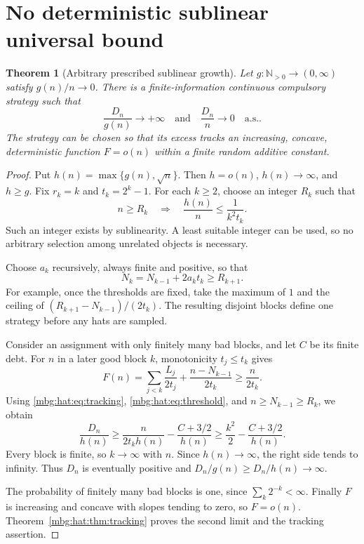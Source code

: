 \documentclass[11pt,letterpaper]{article}
\newtheorem{theorem}{Theorem}[section]
\theoremstyle{definition}
\newcommand{\N}{\mathbb N}
\newcommand{\as}{\text{a.s.}}
\begin{document}
\section{No deterministic sublinear universal bound}
\label{mbg:hat:sec:main}

\begin{theorem}[Arbitrary prescribed sublinear growth]\label{mbg:hat:thm:main}
Let \(g:\N_{>0}\to(0,\infty)\) satisfy \(g(n)/n\to0\).
There is a finite-information continuous compulsory strategy such that
\[
  \frac{D_n}{g(n)}\longrightarrow+\infty
  \quad\text{and}\quad
  \frac{D_n}{n}\longrightarrow0
  \quad\as.                                               \tag{24.1}\label{mbg:hat:eq:main}
\]
The strategy can be chosen so that its excess tracks an increasing,
concave, deterministic function \(F=o(n)\) within a finite random
additive constant.
\end{theorem}
\begin{proof}
Put \(h(n)=\max\{g(n),\sqrt n\}\). Then \(h=o(n)\),
\(h(n)\to\infty\), and \(h\ge g\).
Fix \(r_k=k\) and \(t_k=2^k-1\).
For each \(k\ge2\), choose an integer \(R_k\) such that
\[
  n\ge R_k
  \quad\Longrightarrow\quad
  \frac{h(n)}{n}\le\frac1{k^2t_k}.                        \tag{24.2}\label{mbg:hat:eq:threshold}
\]
Such an integer exists by sublinearity. A least suitable integer
can be used, so no arbitrary selection among unrelated objects
is necessary.

Choose \(a_k\) recursively, always finite and positive, so that
\[
  N_k=N_{k-1}+2a_kt_k\ge R_{k+1}.                        \tag{24.3}\label{mbg:hat:eq:schedule}
\]
For example, once the thresholds are fixed, take the maximum of
\(1\) and the ceiling of
\((R_{k+1}-N_{k-1})/(2t_k)\).
The resulting disjoint blocks define one strategy before any hats
are sampled.

Consider an assignment with only finitely many bad blocks, and let
\(C\) be its finite debt. For \(n\) in a later good block \(k\),
monotonicity \(t_j\le t_k\) gives
\[
  F(n)
  =\sum_{j<k}\frac{L_j}{2t_j}
      +\frac{n-N_{k-1}}{2t_k}
  \ge\frac n{2t_k}.
\]
Using \eqref{mbg:hat:eq:tracking}, \eqref{mbg:hat:eq:threshold}, and
\(n\ge N_{k-1}\ge R_k\), we obtain
\[
  \frac{D_n}{h(n)}
  \ge
  \frac{n}{2t_kh(n)}-\frac{C+3/2}{h(n)}
  \ge \frac{k^2}{2}-\frac{C+3/2}{h(n)}.                  \tag{24.4}\label{mbg:hat:eq:main-estimate}
\]
Every block is finite, so \(k\to\infty\) with \(n\).
Since \(h(n)\to\infty\), the right side tends to infinity.
Thus \(D_n\) is eventually positive and
\(D_n/g(n)\ge D_n/h(n)\to\infty\).

The probability of finitely many bad blocks is one, since
\(\sum_k2^{-k}<\infty\). Finally \(F\) is increasing and concave
with slopes tending to zero, so \(F=o(n)\).
Theorem~\ref{mbg:hat:thm:tracking} proves the second limit and the tracking
assertion.
\end{proof}
\end{document}
